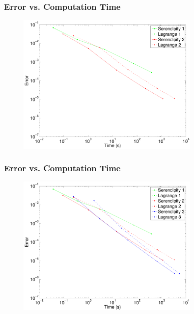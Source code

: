 \documentclass[serif,12pt]{beamer}
\begin{document}
\begin{frame}
\frametitle{Error vs. Computation Time}
	\begin{figure}
   		\includegraphics[width=0.8\textwidth]{figures/serendipityConvergence2.pdf}
	\end{figure}
\end{frame}

\begin{frame}
\frametitle{Error vs. Computation Time}
	\begin{figure}
   		\includegraphics[width=0.8\textwidth]{figures/serendipityConvergence3.pdf}
	\end{figure}
\end{frame}
\end{document}

